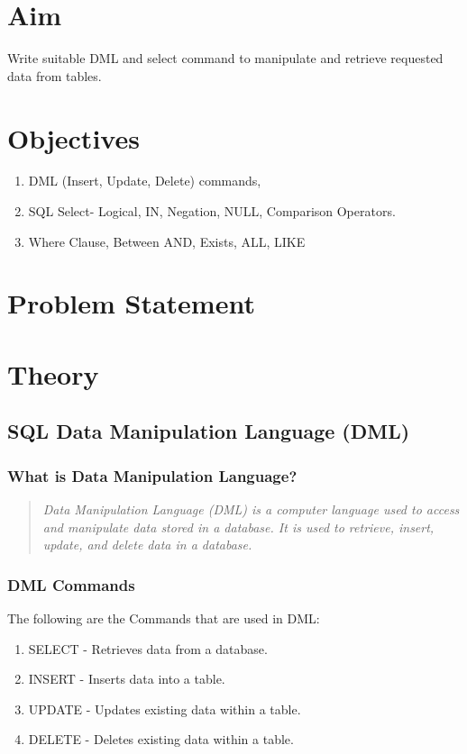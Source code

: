 \documentclass[11pt]{article}
\begin{document}
\tableofcontents
\thispagestyle{empty}
\clearpage

\setcounter{page}{1}

\section{Aim}
Write suitable DML and select command to manipulate and retrieve requested data from tables.
\section{Objectives}
\begin{enumerate}
	\item DML (Insert, Update, Delete) commands,
	\item SQL Select- Logical, IN, Negation, NULL, Comparison Operators.
	\item Where Clause, Between AND, Exists, ALL, LIKE
\end{enumerate}

\section{Problem Statement}

\section{Theory}
\subsection{SQL Data Manipulation Language (DML)}

\subsubsection{What is Data Manipulation Language?}
\begin{quote}
	\textit{Data Manipulation Language (DML) is a computer language used to access and manipulate data stored in a database. It is used to retrieve, insert, update, and delete data in a database. }
\end{quote}
\subsubsection{DML Commands}

The following are the Commands that are used in DML:

\begin{enumerate}
	\item SELECT - Retrieves data from a database.
	\item INSERT - Inserts data into a table.
	\item UPDATE - Updates existing data within a table.
	\item DELETE - Deletes existing data within a table.
\end{enumerate}
\end{document}
